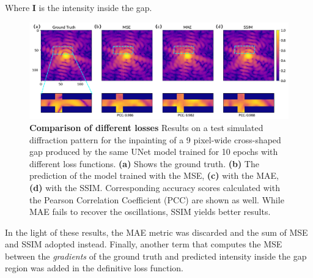 Where \textbf{I} is the intensity inside the gap.

\begin{figure}[h]
    \includegraphics[width=\textwidth]{figures/Inpainting/loss_comparison.pdf}
    \caption{\textbf{Comparison of different losses} Results on a test simulated diffraction pattern for the inpainting 
    of a 9 pixel-wide cross-shaped gap produced by the same UNet model trained for 10 epochs with different loss functions. 
    \textbf{(a)} Shows the ground truth. \textbf{(b)} The prediction of the model trained with the MSE, \textbf{(c)} 
    with the MAE, \textbf{(d)} with the SSIM. Corresponding accuracy scores calculated with the Pearson Correlation 
    Coefficient (PCC) are shown as well. While MAE fails to recover the oscillations, SSIM yields better results.}
    \label{fig:loss_comparison_inpainting}
\end{figure}

In the light of these results, the MAE metric was discarded and the sum of MSE and SSIM adopted instead. 
Finally, another term that computes the MSE between the \textit{gradients} of the ground truth and predicted intensity inside
the gap region was added in the definitive loss function.\\

